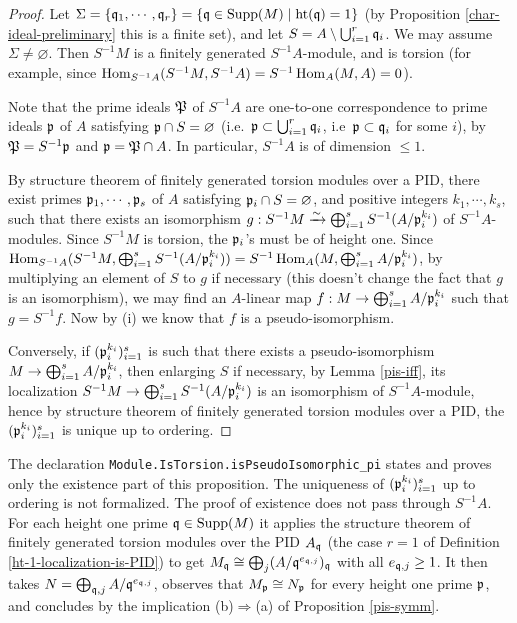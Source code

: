 \begin{proof}
Let
$\Sigma=\{{\mathfrak{q}}_1,\cdots,{\mathfrak{q}}_r\}=\{{\mathfrak{q}}\in{\mathrm{Supp}}(M)\mid{\mathrm{ht}}({\mathfrak{q}})=1\}$
(by Proposition \ref{char-ideal-preliminary} this is a finite set),
and let $S=A\setminus\bigcup_{i=1}^r{\mathfrak{q}}_i$.
We may assume $\Sigma\neq\varnothing$.
Then $S^{-1}M$ is a finitely generated $S^{-1}A$-module,
and is torsion (for example, since $\operatorname{Hom}_{S^{-1}A}(S^{-1}M,S^{-1}A)
=S^{-1}\operatorname{Hom}_A(M,A)=0$).

Note that the prime ideals ${\mathfrak{P}}$ of $S^{-1}A$ are one-to-one correspondence
to prime ideals ${\mathfrak{p}}$ of $A$ satisfying ${\mathfrak{p}}\cap S=\varnothing$
(i.e.~${\mathfrak{p}}\subset\bigcup_{i=1}^r{\mathfrak{q}}_i$, i.e~${\mathfrak{p}}\subset{\mathfrak{q}}_i$ for some $i$),
by ${\mathfrak{P}}=S^{-1}{\mathfrak{p}}$ and ${\mathfrak{p}}={\mathfrak{P}}\cap A$.
In particular, $S^{-1}A$ is of dimension $\leq 1$.

By structure theorem of finitely generated torsion modules over a PID,
there exist primes ${\mathfrak{p}}_1,\cdots,{\mathfrak{p}}_s$ of $A$
satisfying ${\mathfrak{p}}_i\cap S=\varnothing$,
and positive integers $k_1,\cdots,k_s$, such that
there exists an isomorphism
$g:S^{-1}M\xrightarrow\sim\bigoplus_{i=1}^sS^{-1}(A/{\mathfrak{p}}_i^{k_i})$
of $S^{-1}A$-modules.
Since $S^{-1}M$ is torsion, the ${\mathfrak{p}}_i$'s must be of height one.
Since $\operatorname{Hom}_{S^{-1}A}(S^{-1}M,\bigoplus_{i=1}^sS^{-1}(A/{\mathfrak{p}}_i^{k_i}))
=S^{-1}\operatorname{Hom}_A(M,\bigoplus_{i=1}^sA/{\mathfrak{p}}_i^{k_i})$,
by multiplying an element of $S$ to $g$ if necessary
(this doesn't change the fact that $g$ is an isomorphism), we may find
an $A$-linear map $f:M\to\bigoplus_{i=1}^sA/{\mathfrak{p}}_i^{k_i}$
such that $g=S^{-1}f$.
Now by (i) we know that $f$ is a pseudo-isomorphism.

Conversely, if $({\mathfrak{p}}_i^{k_i})_{i=1}^s$ is such that there exists a
pseudo-isomorphism
$M\to\bigoplus_{i=1}^s A/{\mathfrak{p}}_i^{k_i}$,
then enlarging $S$ if necessary, by Lemma \ref{pis-iff},
its localization
$S^{-1}M\to\bigoplus_{i=1}^sS^{-1}(A/{\mathfrak{p}}_i^{k_i})$
is an isomorphism of $S^{-1}A$-module, hence by
structure theorem of finitely generated torsion modules over a PID,
the $({\mathfrak{p}}_i^{k_i})_{i=1}^s$ is unique up to ordering.
\end{proof}

\begin{remark}
The {\Lean} declaration \texttt{Module.IsTorsion.isPseudoIsomorphic\_pi} states
and proves only the existence part of this proposition. The uniqueness of
$({\mathfrak{p}}_i^{k_i})_{i=1}^s$ up to ordering is not formalized. The {\Lean} proof of
existence does not pass through $S^{-1}A$. For each height one prime
${\mathfrak{q}}\in{\mathrm{Supp}}(M)$ it applies the structure theorem of finitely generated torsion
modules over the PID $A_{\mathfrak{q}}$ (the case $r=1$ of Definition
\ref{ht-1-localization-is-PID}) to get
$M_{\mathfrak{q}}\cong\bigoplus_j(A/{\mathfrak{q}}^{e_{{\mathfrak{q}},j}})_{\mathfrak{q}}$ with all $e_{{\mathfrak{q}},j}\geq 1$. It
then takes $N=\bigoplus_{{\mathfrak{q}},j}A/{\mathfrak{q}}^{e_{{\mathfrak{q}},j}}$, observes that $M_{\mathfrak{p}}\cong
N_{\mathfrak{p}}$ for every height one prime ${\mathfrak{p}}$, and concludes by the implication
(b)$\Rightarrow$(a) of Proposition \ref{pis-symm}.
\end{remark}

